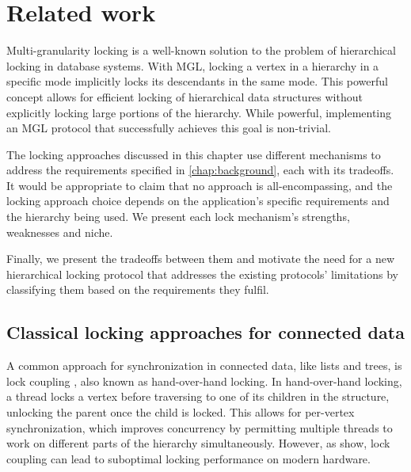 \chapter{Related work} \label{chap:relatedwork}

\minitoc

Multi-granularity locking is a well-known solution to the problem of hierarchical locking in database systems. 
With MGL, locking a vertex in a hierarchy in a specific mode implicitly locks its descendants in the same mode. 
This powerful concept allows for efficient locking of hierarchical data structures without explicitly locking large portions of the hierarchy.
While powerful, implementing an MGL protocol that successfully achieves this goal is non-trivial. 


The locking approaches discussed in this chapter use different mechanisms to address the requirements specified in \cref{chap:background}, each with its tradeoffs. 
It would be appropriate to claim that no approach is all-encompassing, and the locking approach choice depends on the application's specific requirements and the hierarchy being used. We present each lock mechanism's strengths, weaknesses and niche.

Finally, we present the tradeoffs between them and motivate the need for a new hierarchical locking protocol that addresses the existing protocols' limitations by classifying them based on the requirements they fulfil.


\section{Classical locking approaches for connected data}

A common approach for synchronization in connected data, like lists and trees, is lock coupling \cite{DBLP:journals/acta/BayerS77}, also known as hand-over-hand locking. In hand-over-hand locking, a thread locks a vertex before traversing to one of its children in the structure, unlocking the parent once the child is locked. 
This allows for per-vertex synchronization, which improves concurrency by permitting multiple threads to work on different parts of the hierarchy simultaneously. 
However, as \citet{LeisH019} show, lock coupling can lead to suboptimal locking performance on modern hardware.


